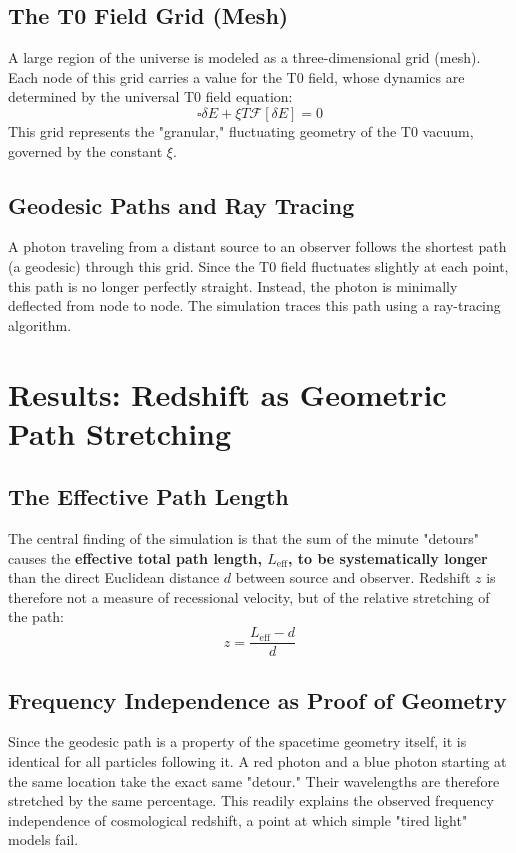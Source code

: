 	\subsection{The T0 Field Grid (Mesh)}
	A large region of the universe is modeled as a three-dimensional grid (mesh). Each node of this grid carries a value for the T0 field, whose dynamics are determined by the universal T0 field equation:
	\begin{equation}
		\square\delta E + \xi T \mathcal{F}[\delta E] = 0
	\end{equation}
	This grid represents the "granular," fluctuating geometry of the T0 vacuum, governed by the constant $\xi$.
	\subsection{Geodesic Paths and Ray Tracing}
	A photon traveling from a distant source to an observer follows the shortest path (a geodesic) through this grid. Since the T0 field fluctuates slightly at each point, this path is no longer perfectly straight. Instead, the photon is minimally deflected from node to node. The simulation traces this path using a ray-tracing algorithm.
	\section{Results: Redshift as Geometric Path Stretching}
	\subsection{The Effective Path Length}
	The central finding of the simulation is that the sum of the minute "detours" causes the \textbf{effective total path length, $L_{\text{eff}}$, to be systematically longer} than the direct Euclidean distance $d$ between source and observer.
	Redshift $z$ is therefore not a measure of recessional velocity, but of the relative stretching of the path:
	\begin{equation}
		z = \frac{L_{\text{eff}} - d}{d}
	\end{equation}
	\subsection{Frequency Independence as Proof of Geometry}
	Since the geodesic path is a property of the spacetime geometry itself, it is identical for all particles following it. A red photon and a blue photon starting at the same location take the exact same "detour." Their wavelengths are therefore stretched by the same percentage. This readily explains the observed frequency independence of cosmological redshift, a point at which simple "tired light" models fail.
